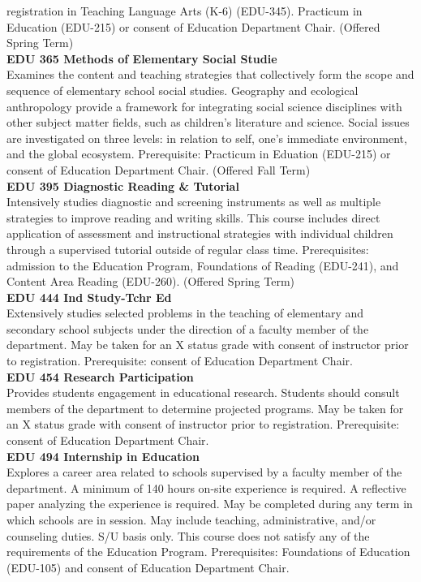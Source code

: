 \documentclass[
  letterpaper,
]{scrbook}
\begin{document}
registration in Teaching Language Arts (K-6) (EDU-345). Practicum in
Education (EDU-215) or consent of Education Department Chair. (Offered
Spring Term)\\
\textbf{EDU 365 Methods of Elementary Social Studie}\\
Examines the content and teaching strategies that collectively form the
scope and sequence of elementary school social studies. Geography and
ecological anthropology provide a framework for integrating social
science disciplines with other subject matter fields, such as children's
literature and science. Social issues are investigated on three levels:
in relation to self, one's immediate environment, and the global
ecosystem. Prerequisite: Practicum in Eduation (EDU-215) or consent of
Education Department Chair. (Offered Fall Term)\\
\textbf{EDU 395 Diagnostic Reading \& Tutorial}\\
Intensively studies diagnostic and screening instruments as well as
multiple strategies to improve reading and writing skills. This course
includes direct application of assessment and instructional strategies
with individual children through a supervised tutorial outside of
regular class time. Prerequisites: admission to the Education Program,
Foundations of Reading (EDU-241), and Content Area Reading (EDU-260).
(Offered Spring Term)\\
\textbf{EDU 444 Ind Study-Tchr Ed}\\
Extensively studies selected problems in the teaching of elementary and
secondary school subjects under the direction of a faculty member of the
department. May be taken for an X status grade with consent of
instructor prior to registration. Prerequisite: consent of Education
Department Chair.\\
\textbf{EDU 454 Research Participation}\\
Provides students engagement in educational research. Students should
consult members of the department to determine projected programs. May
be taken for an X status grade with consent of instructor prior to
registration. Prerequisite: consent of Education Department Chair.\\
\textbf{EDU 494 Internship in Education}\\
Explores a career area related to schools supervised by a faculty member
of the department. A minimum of 140 hours on-site experience is
required. A reflective paper analyzing the experience is required. May
be completed during any term in which schools are in session. May
include teaching, administrative, and/or counseling duties. S/U basis
only. This course does not satisfy any of the requirements of the
Education Program. Prerequisites: Foundations of Education (EDU-105) and
consent of Education Department Chair.
\end{document}
